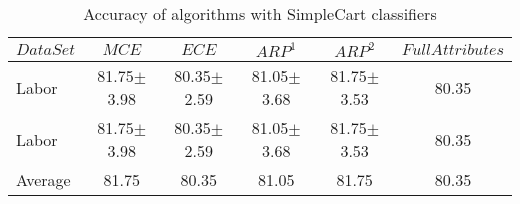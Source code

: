 \documentclass[final,5p,times]{elsarticle}
\begin{document}
\begin{table*}[htbp]
\centering
\caption{Accuracy of  algorithms with SimpleCart classifiers}
\label{tab:reduction:accresults:simplecart}
	\begin{tabular}{lccccc}
	\toprule
	$DataSet$ &
	$MCE$ &
	$ECE$ &
	$ARP^1$ &
	$ARP^2$ &
	$FullAttributes$ \\
	\midrule
	Labor	&	81.75$\pm$3.98	&	80.35$\pm$2.59	&	81.05$\pm$3.68	&	81.75$\pm$3.53	&	80.35	\\
	Labor	&	81.75$\pm$3.98	&	80.35$\pm$2.59	&	81.05$\pm$3.68	&	81.75$\pm$3.53	&	80.35	\\
	\midrule
	Average	&	81.75	&	80.35	&	81.05	&	81.75	&	80.35	\\
	\bottomrule
	\end{tabular}
\end{table*}
\end{document}

